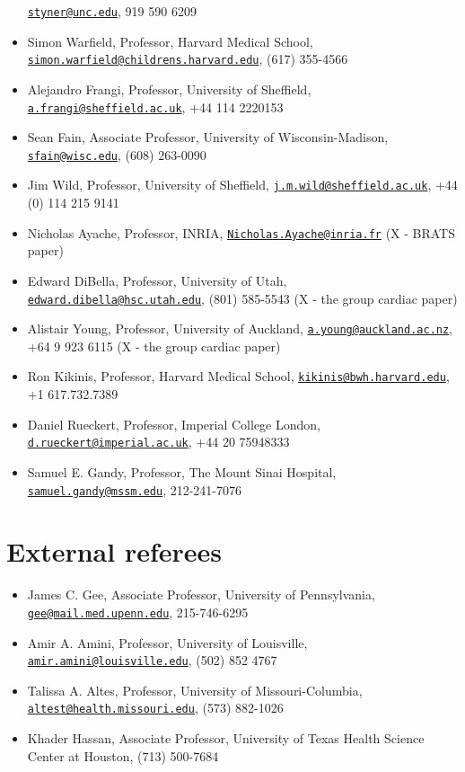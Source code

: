\documentclass[12pt,]{article}
\providecommand{\tightlist}{%
  \setlength{\itemsep}{0pt}\setlength{\parskip}{0pt}}
\begin{document}
\begin{itemize}
  \href{mailto:styner@unc.edu}{\nolinkurl{styner@unc.edu}}, 919 590 6209
\item
  Simon Warfield, Professor, Harvard Medical School,
  \href{mailto:simon.warfield@childrens.harvard.edu}{\nolinkurl{simon.warfield@childrens.harvard.edu}},
  (617) 355-4566
\item
  Alejandro Frangi, Professor, University of Sheffield,
  \href{mailto:a.frangi@sheffield.ac.uk}{\nolinkurl{a.frangi@sheffield.ac.uk}},
  +44 114 2220153
\item
  Sean Fain, Associate Professor, University of Wisconsin-Madison,
  \href{mailto:sfain@wisc.edu}{\nolinkurl{sfain@wisc.edu}}, (608)
  263-0090
\item
  Jim Wild, Professor, University of Sheffield,
  \href{mailto:j.m.wild@sheffield.ac.uk}{\nolinkurl{j.m.wild@sheffield.ac.uk}},
  +44 (0) 114 215 9141
\item
  Nicholas Ayache, Professor, INRIA,
  \href{mailto:Nicholas.Ayache@inria.fr}{\nolinkurl{Nicholas.Ayache@inria.fr}}
  (X - BRATS paper)
\item
  Edward DiBella, Professor, University of Utah,
  \href{mailto:edward.dibella@hsc.utah.edu}{\nolinkurl{edward.dibella@hsc.utah.edu}},
  (801) 585-5543 (X - the group cardiac paper)
\item
  Alistair Young, Professor, University of Auckland,
  \href{mailto:a.young@auckland.ac.nz}{\nolinkurl{a.young@auckland.ac.nz}},
  +64 9 923 6115 (X - the group cardiac paper)
\item
  Ron Kikinis, Professor, Harvard Medical School,
  \href{mailto:kikinis@bwh.harvard.edu}{\nolinkurl{kikinis@bwh.harvard.edu}},
  +1 617.732.7389
\item
  Daniel Rueckert, Professor, Imperial College London,
  \href{mailto:d.rueckert@imperial.ac.uk}{\nolinkurl{d.rueckert@imperial.ac.uk}},
  +44 20 75948333
\item
  Samuel E. Gandy, Professor, The Mount Sinai Hospital,
  \href{mailto:samuel.gandy@mssm.edu}{\nolinkurl{samuel.gandy@mssm.edu}},
  212-241-7076
\end{itemize}

\section{External referees}\label{external-referees}

\begin{itemize}
\tightlist
\item
  James C. Gee, Associate Professor, University of Pennsylvania,
  \href{mailto:gee@mail.med.upenn.edu}{\nolinkurl{gee@mail.med.upenn.edu}},
  215-746-6295
\item
  Amir A. Amini, Professor, University of Louisville,
  \href{mailto:amir.amini@louisville.edu}{\nolinkurl{amir.amini@louisville.edu}},
  (502) 852 4767
\item
  Talissa A. Altes, Professor, University of Missouri-Columbia,
  \href{mailto:altest@health.missouri.edu}{\nolinkurl{altest@health.missouri.edu}},
  (573) 882-1026
\item
  Khader Hassan, Associate Professor, University of Texas Health Science
  Center at Houston, (713) 500-7684
\end{itemize}
\end{document}
